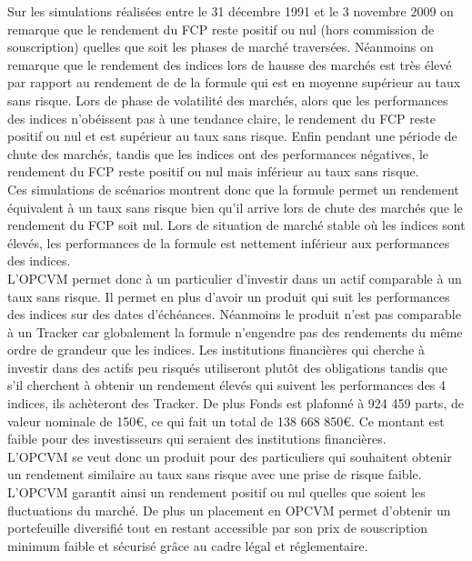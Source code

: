 \documentclass[french,12pt,a4paper]{article}
\begin{document}
\indent Sur les simulations réalisées entre le 31 décembre 1991 et le 3 novembre 2009 on remarque que le rendement du FCP reste positif ou nul (hors commission de souscription) quelles que soit les phases de marché traversées. Néanmoins on remarque que le rendement des indices lors de hausse des marchés est très élevé par rapport au rendement de de la formule qui est en moyenne supérieur au taux sans risque. Lors de phase de volatilité des marchés, alors que les performances des indices n'obéissent pas à une tendance claire, le rendement du FCP reste positif ou nul et est supérieur au taux sans risque. Enfin pendant une période de chute des marchés, tandis que les indices ont des performances négatives, le rendement du FCP reste positif ou nul mais inférieur au taux sans risque. \\
\indent Ces simulations de scénarios montrent donc que la formule permet un rendement équivalent à un taux sans risque bien qu'il arrive lors de chute des marchés que le rendement du FCP soit nul. Lors de situation de marché stable où les indices sont élevés, les performances de la formule est nettement inférieur aux performances des indices. \\
\indent L'OPCVM permet donc à un particulier d'investir dans un actif comparable à un taux sans risque. Il permet en plus d'avoir un produit qui suit les performances des indices sur des dates d'échéances. Néanmoins le produit n'est pas comparable à un Tracker car globalement la formule n'engendre pas des rendements du même ordre de grandeur que les indices. Les institutions financières qui cherche à investir dans des actifs peu risqués utiliseront plutôt des obligations tandis que s'il cherchent à obtenir un rendement élevés qui suivent les performances des 4 indices, ils achèteront des Tracker. De plus Fonds est plafonné à 924 459 parts, de valeur nominale de 150€, ce qui fait un total de 138 668 850€. Ce montant est faible pour des investisseurs qui seraient des institutions financières.\\
\indent L'OPCVM se veut donc un produit pour des particuliers qui souhaitent obtenir un rendement similaire au taux sans risque avec une prise de risque faible. L'OPCVM garantit ainsi un rendement positif ou nul quelles que soient les fluctuations du marché. De plus un placement en OPCVM permet d'obtenir un portefeuille diversifié tout en restant accessible par son prix de souscription minimum faible et sécurisé grâce au cadre légal et réglementaire.\\
\end{document}
